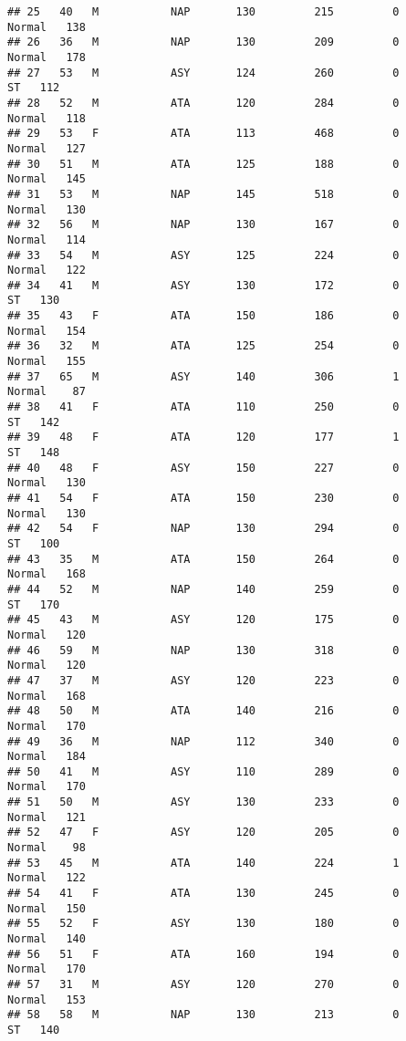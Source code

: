 \documentclass[
]{article}
\begin{document}
\begin{verbatim}
## 25   40   M           NAP       130         215         0     Normal   138
## 26   36   M           NAP       130         209         0     Normal   178
## 27   53   M           ASY       124         260         0         ST   112
## 28   52   M           ATA       120         284         0     Normal   118
## 29   53   F           ATA       113         468         0     Normal   127
## 30   51   M           ATA       125         188         0     Normal   145
## 31   53   M           NAP       145         518         0     Normal   130
## 32   56   M           NAP       130         167         0     Normal   114
## 33   54   M           ASY       125         224         0     Normal   122
## 34   41   M           ASY       130         172         0         ST   130
## 35   43   F           ATA       150         186         0     Normal   154
## 36   32   M           ATA       125         254         0     Normal   155
## 37   65   M           ASY       140         306         1     Normal    87
## 38   41   F           ATA       110         250         0         ST   142
## 39   48   F           ATA       120         177         1         ST   148
## 40   48   F           ASY       150         227         0     Normal   130
## 41   54   F           ATA       150         230         0     Normal   130
## 42   54   F           NAP       130         294         0         ST   100
## 43   35   M           ATA       150         264         0     Normal   168
## 44   52   M           NAP       140         259         0         ST   170
## 45   43   M           ASY       120         175         0     Normal   120
## 46   59   M           NAP       130         318         0     Normal   120
## 47   37   M           ASY       120         223         0     Normal   168
## 48   50   M           ATA       140         216         0     Normal   170
## 49   36   M           NAP       112         340         0     Normal   184
## 50   41   M           ASY       110         289         0     Normal   170
## 51   50   M           ASY       130         233         0     Normal   121
## 52   47   F           ASY       120         205         0     Normal    98
## 53   45   M           ATA       140         224         1     Normal   122
## 54   41   F           ATA       130         245         0     Normal   150
## 55   52   F           ASY       130         180         0     Normal   140
## 56   51   F           ATA       160         194         0     Normal   170
## 57   31   M           ASY       120         270         0     Normal   153
## 58   58   M           NAP       130         213         0         ST   140

\end{verbatim}
\end{document}
